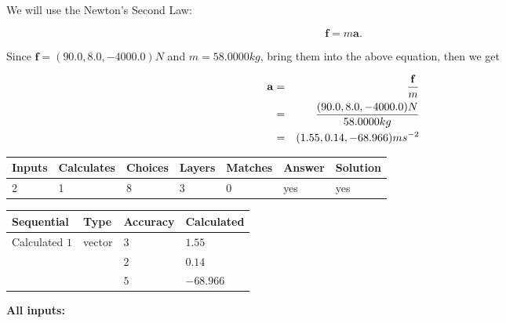 \documentclass[12pt]{article}
\begin{document}
 

We will use the Newton's Second Law:
 
\[
\mathbf{f}=m\mathbf{a}.
\]
 
Since $\mathbf{f}= %
(90.0 , 8.0 , -4000.0) N$
and $m= %
58.0000kg$, bring them into the above equation, then we get
 
\begin{eqnarray*}
\mathbf{a}&=&\frac{\mathbf{f}}m  \\
&=&\frac{ %
(90.0 , 8.0 , -4000.0) N}{ %
58.0000kg}  \\
&=& %
(1.55 , 0.14 , -68.966) ms^{-2}
\end{eqnarray*}
 
 
 
\noindent{}
 
 

 
\vspace{0.3in}
   
   
   
   
\noindent\begin{tabular}{|l|l|l|l|l|l|l|}
 \hline
Inputs & Calculates & Choices & Layers & Matches & Answer & Solution \\ \hline
           2  & 
           1  & 
           8
  & 
           3  & 
           0  & 
  yes & 
  yes 
  \\ \hline
 \end{tabular}
   
   
   
   
\noindent{}
   
   
  
  
\noindent\begin{tabular}{|l|l|l|l|}
\hline
 Sequential & Type & Accuracy & Calculated \\ 
\hline
 
 
  Calculated $            1 $ & vector &  
  $            3  $ 
 &  $ 1.55 $ 
 \\    
  & & 
  $            2  $ 
 &  $ 0.14 $ 
 \\    
  & & 
  $            5  $ 
 &  $ -68.966 $ 
 \\  \hline  
 \end{tabular}
   
   
   
   
\noindent\vspace{0.1in}\hspace{-0.08in} {\textbf{\Large{All inputs: }}}
   
\end{document}
